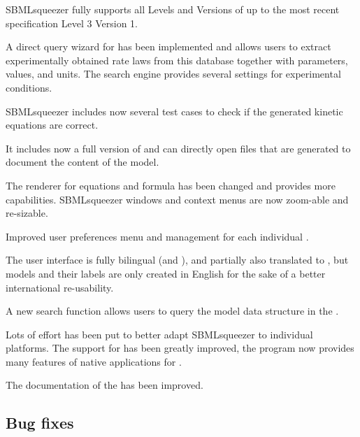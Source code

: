 \begin{dinglist}{52}
\item SBMLsqueezer fully supports all Levels and Versions of \SBML up to the most
      recent specification Level 3 Version 1.
\item A direct query wizard for \SABIO has been implemented and allows users to
      extract experimentally obtained rate laws from this database together with
      parameters, values, and units. The search engine provides several settings for
      experimental conditions.
\item SBMLsqueezer includes now several \JUnit test cases to check if the generated
      kinetic equations are correct.
\item It includes now a full version of \SBMLLaTeX and can directly open \PDF files
      that are generated to document the content of the model.
\item The renderer for equations and formula has been changed and provides more
      capabilities. SBMLsqueezer windows and context menus are now zoom-able and
      re-sizable.
\item Improved user preferences menu and management for each individual \OS.
\item The user interface is fully bilingual (\German and \English), and partially also
      translated to \Chinese, but models and their labels are only created in English for the sake
      of a better international re-usability.
\item A new search function allows users to query the model data structure in the
      \GUI.
\item Lots of effort has been put to better adapt SBMLsqueezer to individual
      platforms. The support for \MacOSX has been greatly improved, the program now
      provides many features of native applications for \MacOSX.
\item The documentation of the \API has been improved.
\end{dinglist}

\subsection{Bug fixes}


